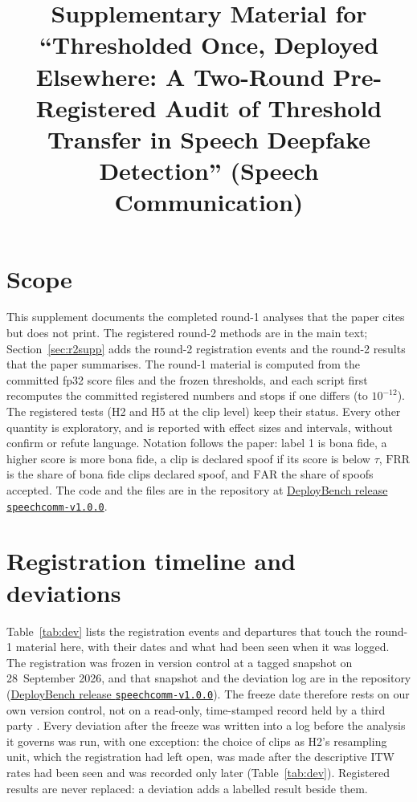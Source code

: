 \documentclass[10pt]{article}
\title{Supplementary Material for\\ ``Thresholded Once, Deployed Elsewhere: A Two-Round Pre-Registered Audit of Threshold Transfer in Speech
Deepfake Detection'' (Speech Communication)}
\author{\todo{Author names and affiliations}}
\date{}
\newcommand{\repo}{\href{https://github.com/henryhoang207/Deploy-Bench/releases/tag/speechcomm-v1.0.0}{DeployBench release \texttt{speechcomm-v1.0.0}}}
\newcommand{\frr}{\mathrm{FRR}}
\newcommand{\far}{\mathrm{FAR}}
\begin{document}
\maketitle

\section{Scope}
This supplement documents the completed round-1 analyses that the paper cites but does not print. The registered
round-2 methods are in the main text; Section~\ref{sec:r2supp} adds the round-2 registration events and the round-2
results that the paper summarises. The round-1 material is computed from the committed fp32 score
files and the frozen thresholds, and each script first recomputes the committed registered numbers and stops if one differs (to
\(10^{-12}\)). The registered tests (H2 and H5 at the clip level) keep their status. Every other quantity is exploratory, and is reported
with effect sizes and intervals, without confirm or refute language. Notation follows the paper: label 1 is bona fide, a higher score is
more bona fide, a clip is declared spoof if its score is below \(\tau\), \(\frr\) is the share of bona fide clips declared spoof, and
\(\far\) the share of spoofs accepted. The code and the files are in the repository at \repo.

\section{Registration timeline and deviations}
Table~\ref{tab:dev} lists the registration events and departures that touch the round-1 material here, with their dates and what had been seen
when it was logged. The registration was frozen in version control at a tagged snapshot on 28~September 2026, and that snapshot and the deviation log are in the repository (\repo). The freeze date therefore rests on our own version control, not on a read-only, time-stamped record held by a third party \citep[on the value of such a record, see][]{nosek18_prereg}. Every
deviation after the freeze was written into a log before the analysis it governs was run, with one exception: the
choice of clips as H2's resampling unit, which the registration had left open, was made after the descriptive ITW rates
had been seen and was recorded only later (Table~\ref{tab:dev}). Registered results are never replaced: a deviation
adds a labelled result beside them.
\end{document}
